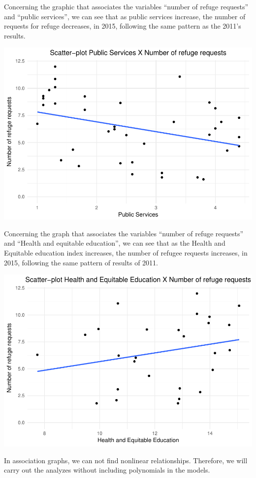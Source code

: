 \documentclass[]{elsarticle} %
\makeatletter
\def\maxwidth{\ifdim\Gin@nat@width>\linewidth\linewidth
\else\Gin@nat@width\fi}
\let\Oldincludegraphics\includegraphics
\renewcommand{\includegraphics}[1]{\Oldincludegraphics[width=\maxwidth]{#1}}
\makeatother
\begin{document}
Concerning the graphic that associates the variables ``number of refuge
requests'' and ``public services'', we can see that as public services
increase, the number of requests for refuge decreases, in 2015,
following the same pattern as the 2011's results.

\includegraphics{refugees-stephanie_files/figure-latex/model_1_3-1.pdf}

Concerning the graph that associates the variables ``number of refuge
requests'' and ``Health and equitable education'', we can see that as
the Health and Equitable education index increases, the number of
refugee requests increases, in 2015, following the same pattern of
results of 2011.

\includegraphics{refugees-stephanie_files/figure-latex/model_1_4-1.pdf}

In association graphs, we can not find nonlinear relationships.
Therefore, we will carry out the analyzes without including polynomials
in the models.
\end{document}
